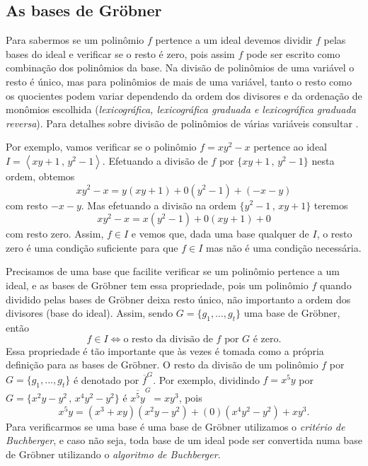 \subsection*{As bases de Gr\"obner}

Para sabermos se um polinômio $f$ pertence a um ideal devemos dividir $f$ pelas bases do ideal e verificar se o resto é zero, pois assim $f$ pode ser escrito como combinação dos polinômios da base. Na divisão de polinômios de uma variável o resto é único, mas para polinômios de mais de uma variável, tanto o resto como os quocientes podem variar dependendo da ordem dos divisores e da ordenação de monômios escolhida ({\it lexicográfica, lexicográfica graduada e lexicográfica graduada reversa}). Para detalhes sobre divisão de polinômios de várias variáveis consultar \citep{cox-ideals}. 

Por exemplo, vamos verificar se o polinômio $f=xy^2-x$ pertence ao ideal $I=\left\langle xy+1\,,\,y^2-1 \right\rangle$. Efetuando a divisão de $f$ por $\{xy+1\,,\,y^2-1\}$ nesta ordem, obtemos
\begin{equation*}
xy^2-x=y(xy+1)+0(y^2-1)+(-x-y)
\end{equation*}  
com resto $-x-y$. Mas efetuando a divisão na ordem $\{y^2-1\,,\,xy+1\}$ teremos
\begin{equation*}
xy^2-x=x(y^2-1)+0(xy+1)+0
\end{equation*} 
com resto zero. Assim, $f\in I$ e vemos que, dada uma base qualquer de $I$, o resto zero é uma condição suficiente para que $f\in I$ mas não é uma condição necessária. 

Precisamos de uma base que facilite verificar se um polinômio pertence a um ideal, e as bases de Gr\"obner tem essa propriedade, pois um polinômio $f$ quando dividido pelas bases de Gr\"obner deixa resto único, não importanto a ordem dos divisores (base do ideal). Assim, sendo $G=\{g_1,...,g_t\}$ uma base de Gr\"obner, então 
\begin{equation*}
f\in I \Leftrightarrow \text{o resto da divisão de $f$ por $G$ é zero}.
\end{equation*}
Essa propriedade é tão importante que às vezes é tomada como a própria definição para as bases de Gr\"obner. O resto da divisão de um polinômio $f$ por $G=\{g_1,...,g_t\}$ é denotado por $\overline{f}^G$. Por exemplo, dividindo $f=x^5y$ por $G=\{x^2y-y^2\,,\,x^4y^2-y^2\}$ é $\overline{x^5y}^G=xy^3$, pois
\begin{equation*}
x^5y=(x^3+xy)(x^2y-y^2)+(0)(x^4y^2-y^2)+xy^3.
\end{equation*}
Para verificarmos se uma base é uma base de Gr\"obner utilizamos o {\it critério de Buchberger}, e caso não seja, toda base de um ideal pode ser convertida numa base de Gr\"obner utilizando o {\it algoritmo de Buchberger}. 


